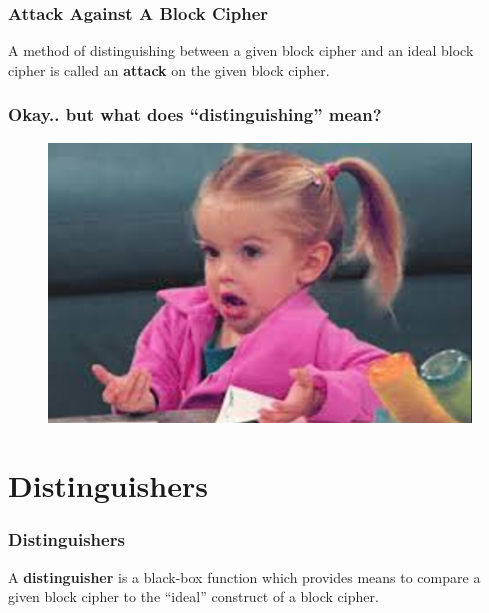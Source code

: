 \documentclass{beamer}
\newcommand{\<}{\langle}
\renewcommand{\>}{\rangle}
\begin{document}
\begin{frame}
\frametitle{Attack Against A Block Cipher}

A method of distinguishing between a given block cipher and an ideal block cipher is called an \textbf{attack} on the given block cipher. 
\end{frame}


\begin{frame}
\frametitle{Okay.. but what does ``distinguishing'' mean?}

\begin{figure}
\includegraphics[scale=.5]{IMG/confused3}
\end{figure}
\end{frame}


\section{Distinguishers}
\begin{frame}
\frametitle{Distinguishers}

A \textbf{distinguisher} is a black-box function which provides means to compare a given block cipher to the ``ideal'' construct of a block cipher. \newline
\end{frame}
\end{document}
